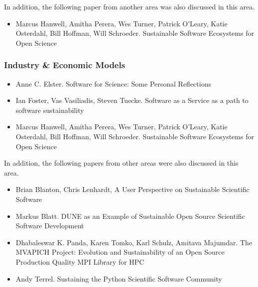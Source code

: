 \documentclass[11pt, oneside]{amsart}
\begin{document}
In addition, the following paper from another area was also discussed
in this area.

\begin{itemize}

\item Marcus Hanwell, Amitha Perera, Wes Turner, Patrick O'Leary,
  Katie Osterdahl, Bill Hoffman, Will Schroeder. Sustainable Software
  Ecosystems for Open Science \cite{Hanwell_WSSSPE}

\end{itemize}

\subsubsection*{Industry \& Economic Models}

\begin{itemize}

\item Anne C. Elster. Software for Science: Some Personal Reflections
  \cite{Elster_WSSSPE}

\item Ian Foster, Vas Vasiliadis, Steven Tuecke. Software as a Service
  as a path to software sustainability \cite{Foster_WSSSPE}

\item Marcus Hanwell, Amitha Perera, Wes Turner, Patrick O'Leary,
  Katie Osterdahl, Bill Hoffman, Will Schroeder. Sustainable Software
  Ecosystems for Open Science \cite{Hanwell_WSSSPE}

\end{itemize}

In addition, the following papers from other areas were also discussed
in this area.

\begin{itemize}

\item Brian Blanton, Chris Lenhardt, A User Perspective on Sustainable
  Scientific Software \cite{Blanton_WSSSPE}

\item Markus Blatt. DUNE as an Example of Sustainable Open Source
  Scientific Software Development \cite{Blatt_WSSSPE}

\item Dhabaleswar K. Panda, Karen Tomko, Karl Schulz, Amitava
  Majumdar. The MVAPICH Project: Evolution and Sustainability of an
  Open Source Production Quality MPI Library for HPC
  \cite{Panda_WSSSPE}

\item Andy Terrel. Sustaining the Python Scientific Software Community
  \cite{Terrel_WSSSPE}

\end{itemize}
\end{document}
